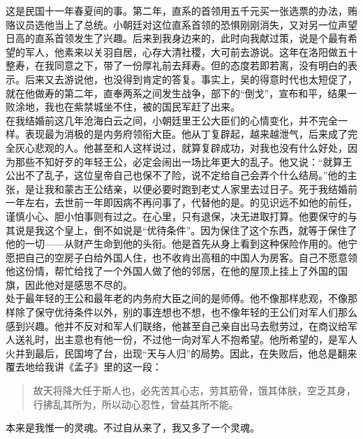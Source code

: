 这是民国十一年春夏间的事。第二年，直系的首领用五千元买一张选票的办法，贿赂议员选他当上了总统。小朝廷对这位直系首领的恐惧刚刚消失，又对另一位声望日高的直系首领发生了兴趣。后来到我身边来的，此时向我献过策，说是个最有希望的军人，他素来以关羽自居，心存大清社稷，大可前去游说。这年在洛阳做五十整寿，在我同意之下，带了一份厚礼前去拜寿。但的态度若即若离，没有明白的表示。后来又去游说他，也没得到肯定的答复。事实上，吴的得意时代也太短促了，就在他做寿的第二年，直奉两系之间发生战争，部下的“倒戈”，宣布和平，结果一败涂地，我也在紫禁城坐不住，被的国民军赶了出来。\\

在我结婚前这几年沧海白云之间，小朝廷里王公大臣们的心情变化，并不完全一样。表现最为消极的是内务府领衔大臣。他从丁复辟起，越来越泄气，后来成了完全灰心悲观的人。他甚至和人这样说过，就算复辟成功，对我也没有什么好处，因为那些不知好歹的年轻王公，必定会闹出一场比年更大的乱子。他又说：“就算王公出不了乱子，这位皇帝自己也保不了险，说不定给自己会弄个什么结局。”他的主张，是让我和蒙古王公结亲，以便必要时跑到老丈人家里去过日子。死于我结婚前一年左右，去世前一年即因病不再问事了，代替他的是。的见识远不如他的前任，谨慎小心、胆小怕事则有过之。在心里，只有退保，决无进取打算。他要保守的与其说是我这个皇上，倒不如说是“优待条件”。因为保住了这个东西，就等于保住了他的一切——从财产生命到他的头衔。他是首先从身上看到这种保险作用的。他宁愿把自己的空房子白给外国人住，也不收肯出高租的中国人为房客。自己不愿意领他这份情，帮忙给找了一个外国人做了他的邻居，在他的屋顶上挂上了外国的国旗，因此他对是感思不尽的。\\

处于最年轻的王公和最年老的内务府大臣之间的是师傅。他不像那样悲观，不像那样除了保守优待条件以外，别的事连想也不想，也不像年轻的王公们对军人们那么感到兴趣。他并不反对和军人们联络，他甚至自己亲自出马去慰劳过，在商议给军人送礼时，出主意也有他一份，不过他一向对军人不抱希望。他所希望的，是军人火并到最后，民国垮了台，出现“天与人归”的局势。因此，在失败后，他总是翻来覆去地给我讲《孟子》里的这一段：\\

\begin{quote}
	故天将降大任于斯人也，必先苦其心志，劳其筋骨，饿其体肤，空乏其身，行拂乱其所为，所以动心忍性，曾益其所不能。\\
\end{quote}

本来是我惟一的灵魂。不过自从来了，我又多了一个灵魂。
